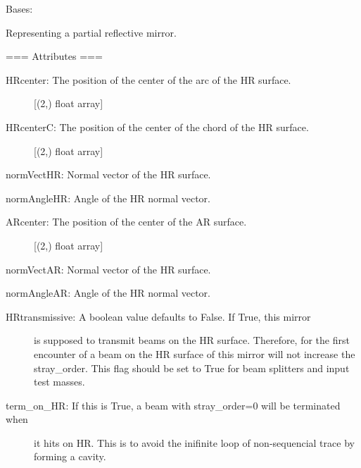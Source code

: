 \documentclass[letterpaper,10pt,english]{sphinxmanual}
\begin{document}
\begin{fulllineitems}
\label{api/gtrace:gtrace.optcomp.Mirror}
Bases: {\hyperref[api/gtrace:gtrace.optcomp.Optics]{}}

Representing a partial reflective mirror.

=== Attributes ===
\begin{description}
\item[{HRcenter: The position of the center of the arc of the HR surface.}] \leavevmode
{[}(2,) float array{]}

\item[{HRcenterC: The position of the center of the chord of the HR surface.}] \leavevmode
{[}(2,) float array{]}

\end{description}

normVectHR: Normal vector of the HR surface.

normAngleHR: Angle of the HR normal vector.
\begin{description}
\item[{ARcenter: The position of the center of the AR surface.}] \leavevmode
{[}(2,) float array{]}

\end{description}

normVectAR: Normal vector of the HR surface.

normAngleAR: Angle of the HR normal vector.
\begin{description}
\item[{HRtransmissive: A boolean value defaults to False. If True, this mirror}] \leavevmode
is supposed to transmit beams on the HR surface. Therefore,
for the first encounter of a beam on the HR surface of this mirror
will not increase the stray\_order. This flag should be set to True for
beam splitters and input test masses.

\item[{term\_on\_HR: If this is True, a beam with stray\_order=0 will be terminated when}] \leavevmode
it hits on HR. This is to avoid the inifinite loop of non-sequencial
trace by forming a cavity.


\end{description}
\end{fulllineitems}
\end{document}
